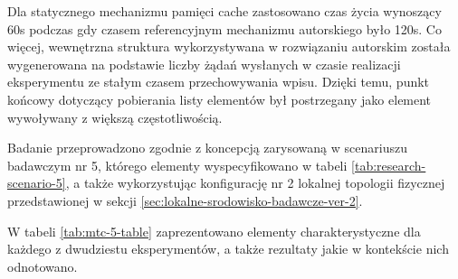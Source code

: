 Dla statycznego mechanizmu pamięci cache zastosowano czas życia wynoszący 60s podczas gdy czasem referencyjnym mechanizmu autorskiego było 120s. Co więcej, wewnętrzna struktura wykorzystywana w rozwiązaniu autorskim została wygenerowana na podstawie liczby żądań wysłanych w czasie realizacji eksperymentu ze stałym czasem przechowywania wpisu. Dzięki temu, punkt końcowy dotyczący pobierania listy elementów był postrzegany jako element wywoływany z większą częstotliwością.

Badanie przeprowadzono zgodnie z koncepcją zarysowaną w scenariuszu badawczym nr 5, którego elementy wyspecyfikowano w tabeli \ref{tab:research-scenario-5}, a także wykorzystując konfigurację nr 2 lokalnej topologii fizycznej przedstawionej w sekcji \ref{sec:lokalne-srodowisko-badawcze-ver-2}.

W tabeli \ref{tab:mtc-5-table} zaprezentowano elementy charakterystyczne dla każdego z dwudziestu eksperymentów, a także rezultaty jakie w kontekście nich odnotowano.

